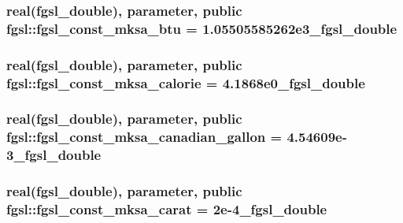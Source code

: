 \subsubsection[{fgsl\+\_\+const\+\_\+mksa\+\_\+btu}]{\setlength{\rightskip}{0pt plus 5cm}real({\bf fgsl\+\_\+double}), parameter, public fgsl\+::fgsl\+\_\+const\+\_\+mksa\+\_\+btu = 1.\+05505585262e3\+\_\+fgsl\+\_\+double}\label{namespacefgsl_a868742553429b50b469d7d21a481cc66}
\hypertarget{namespacefgsl_acb71a08b4387dc29400805067d9aa6ec}{}
\subsubsection[{fgsl\+\_\+const\+\_\+mksa\+\_\+calorie}]{\setlength{\rightskip}{0pt plus 5cm}real({\bf fgsl\+\_\+double}), parameter, public fgsl\+::fgsl\+\_\+const\+\_\+mksa\+\_\+calorie = 4.\+1868e0\+\_\+fgsl\+\_\+double}\label{namespacefgsl_acb71a08b4387dc29400805067d9aa6ec}
\hypertarget{namespacefgsl_a12f46f464315290d696dc0dd7d011aaf}{}
\subsubsection[{fgsl\+\_\+const\+\_\+mksa\+\_\+canadian\+\_\+gallon}]{\setlength{\rightskip}{0pt plus 5cm}real({\bf fgsl\+\_\+double}), parameter, public fgsl\+::fgsl\+\_\+const\+\_\+mksa\+\_\+canadian\+\_\+gallon = 4.\+54609e-\/3\+\_\+fgsl\+\_\+double}\label{namespacefgsl_a12f46f464315290d696dc0dd7d011aaf}
\hypertarget{namespacefgsl_ab0deb9fa34a456a2db1c8833499c5b2f}{}
\subsubsection[{fgsl\+\_\+const\+\_\+mksa\+\_\+carat}]{\setlength{\rightskip}{0pt plus 5cm}real({\bf fgsl\+\_\+double}), parameter, public fgsl\+::fgsl\+\_\+const\+\_\+mksa\+\_\+carat = 2e-\/4\+\_\+fgsl\+\_\+double}\label{namespacefgsl_ab0deb9fa34a456a2db1c8833499c5b2f}
\hypertarget{namespacefgsl_af7eed4749b386e3a913ae8e18cadc2bc}{}
